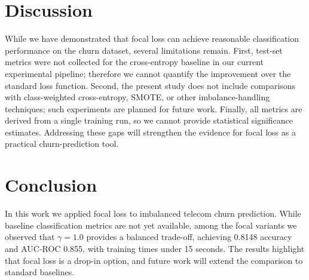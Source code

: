 \documentclass[11pt,a4paper]{article}
\begin{document}
\section{Discussion}
\label{sec:discussion}
While we have demonstrated that focal loss can achieve reasonable classification performance on the churn dataset, several limitations remain. First, test-set metrics were not collected for the cross-entropy baseline in our current experimental pipeline; therefore we cannot quantify the improvement over the standard loss function. Second, the present study does not include comparisons with class-weighted cross-entropy, SMOTE, or other imbalance-handling techniques; such experiments are planned for future work. Finally, all metrics are derived from a single training run, so we cannot provide statistical significance estimates. Addressing these gaps will strengthen the evidence for focal loss as a practical churn-prediction tool.

\section{Conclusion}
\label{sec:conclusion}
In this work we applied focal loss to imbalanced telecom churn prediction. While baseline classification metrics are not yet available, among the focal variants we observed that $\gamma=1.0$ provides a balanced trade-off, achieving 0.8148 accuracy and AUC-ROC 0.855, with training times under 15 seconds. The results highlight that focal loss is a drop-in option, and future work will extend the comparison to standard baselines.

\nocite{*}


\end{document}

